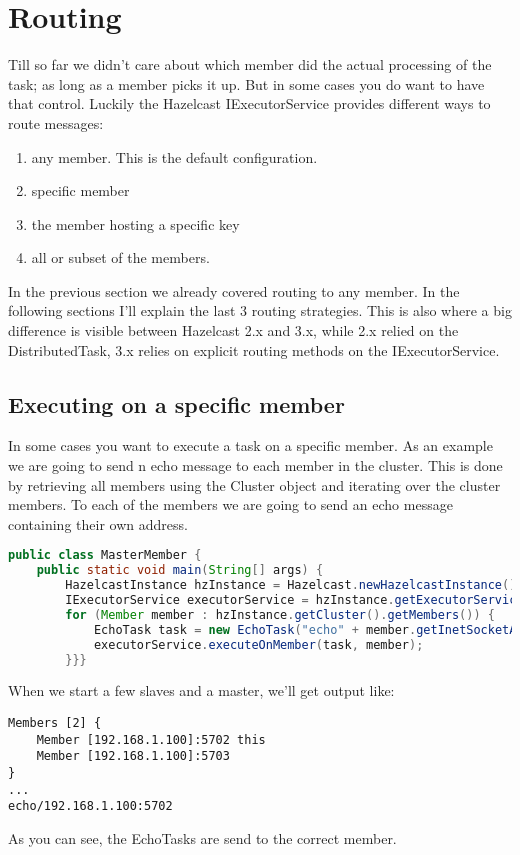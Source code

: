 \section{Routing}
Till so far we didn't care about which member did the actual processing of the task; as long as a member picks it up. But in some cases you do want to have that control. Luckily the Hazelcast IExecutorService provides different ways to route messages:
\begin{enumerate}
\item any member. This is the default configuration.
\item specific member
\item the member hosting a specific key
\item all or subset of the members.
\end{enumerate}
In the previous section we already covered routing to any member. In the following sections I'll explain the last 3 routing strategies. This is also where a big difference is visible between Hazelcast 2.x and 3.x, while 2.x relied on the DistributedTask, 3.x relies on explicit routing methods on the IExecutorService.

\subsection{Executing on a specific member}
In some cases you want to execute a task on a specific member. As an example we are going to send n echo message to each member in the cluster. This is done by retrieving all members using the Cluster object and iterating over the cluster members. To each of the members we are going to send an echo message containing their own address. 
\begin{lstlisting}[language=java]
public class MasterMember {
    public static void main(String[] args) {
        HazelcastInstance hzInstance = Hazelcast.newHazelcastInstance();
        IExecutorService executorService = hzInstance.getExecutorService("executor");
        for (Member member : hzInstance.getCluster().getMembers()) {
            EchoTask task = new EchoTask("echo" + member.getInetSocketAddress());
            executorService.executeOnMember(task, member);
        }}}
\end{lstlisting}
When we start a few slaves and a master, we'll get output like:
\begin{lstlisting}
Members [2] {
	Member [192.168.1.100]:5702 this
	Member [192.168.1.100]:5703
}
...
echo/192.168.1.100:5702
\end{lstlisting}
As you can see, the EchoTasks are send to the correct member.

